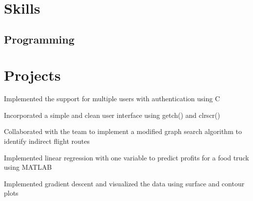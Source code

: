 \documentclass[]{deedy-resume-openfont}
\begin{document}
\begin{minipage}[t]{0.64\textwidth}


\section{Skills}
\subsection{Programming}



\sectionsep


\section{Projects}

\vspace{\topsep} %
\begin{tightemize}
\item Implemented the support for multiple users with authentication using C
\item Incorporated a simple and clean user interface using getch() and clrscr()
\item Collaborated with the team to implement a modified graph search algorithm to identify indirect flight routes
\end{tightemize}
\sectionsep

\begin{tightemize}
\item Implemented linear regression with one variable to predict profits for a food truck using MATLAB
\item Implemented gradient descent and visualized the data using surface and contour plots
\end{tightemize}
\sectionsep



\end{minipage}
\end{document}

